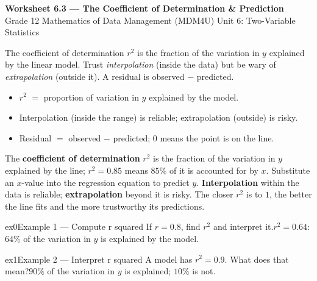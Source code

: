 \documentclass[11pt]{article}
\begin{document}
\begin{center}
{\LARGE\bfseries\color{titleblue}Worksheet 6.3 --- The Coefficient of Determination \& Prediction}\\[2pt]
{\small Grade 12 Mathematics of Data Management (MDM4U) \textperiodcentered{} Unit 6: Two-Variable Statistics}
\end{center}

\begin{ideabox}
The coefficient of determination $r^{2}$ is the fraction of the variation in $y$ explained by the linear model. Trust \emph{interpolation} (inside the data) but be wary of \emph{extrapolation} (outside it). A residual is observed $-$ predicted.
\begin{itemize}[leftmargin=*,itemsep=2pt]
  \item $r^{2}$ $=$ proportion of variation in $y$ explained by the model.
  \item Interpolation (inside the range) is reliable; extrapolation (outside) is risky.
  \item Residual $=$ observed $-$ predicted; $0$ means the point is on the line.
\end{itemize}
\end{ideabox}

\begin{learnbox}
The \textbf{coefficient of determination} $r^2$ is the fraction of the variation in $y$ explained by the line; $r^2=0.85$ means $85\%$ of it is accounted for by $x$.
Substitute an $x$-value into the regression equation to predict $y$. \textbf{Interpolation} within the data is reliable; \textbf{extrapolation} beyond it is risky.
The closer $r^2$ is to $1$, the better the line fits and the more trustworthy its predictions.
\end{learnbox}


\begin{example}{ex0}{Example 1 --- Compute r squared}
If $r=0.8$, find $r^{2}$ and interpret it.\soln $r^{2}=0.64$: $64\%$ of the variation in $y$ is explained by the model.
\end{example}

\begin{example}{ex1}{Example 2 --- Interpret r squared}
A model has $r^{2}=0.9$. What does that mean?\soln $90\%$ of the variation in $y$ is explained; $10\%$ is not.
\end{example}
\end{document}
